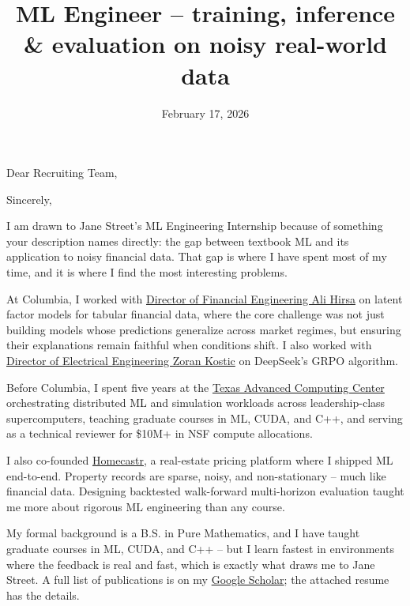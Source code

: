 \documentclass[letterpaper, 10pt,colorlinks,linkcolor=cyan]{moderncv}
\title{\large ML Engineer -- training, inference \& evaluation on noisy real-world data}
\begin{document}
  \hypersetup{urlcolor=links}

  \date{February 17, 2026}
  \opening{Dear Recruiting Team,}
  \closing{Sincerely,}
  \makelettertitle

I am drawn to Jane Street's ML Engineering Internship because of something your description names directly: the gap between textbook ML and its application to noisy financial data. That gap is where I have spent most of my time, and it is where I find the most interesting problems.

At Columbia, I worked with \href{https://alihrsa.github.io/}{Director of Financial Engineering Ali Hirsa} on latent factor models for tabular financial data, where the core challenge was not just building models whose predictions generalize across market regimes, but ensuring their explanations remain faithful when conditions shift. I also worked with \href{https://kostic.ece.columbia.edu/}{Director of Electrical Engineering Zoran Kostic} on DeepSeek's GRPO algorithm.

Before Columbia, I spent five years at the \href{https://www.tacc.utexas.edu/}{Texas Advanced Computing Center} orchestrating distributed ML and simulation workloads across leadership-class supercomputers, teaching graduate courses in ML, CUDA, and C++, and serving as a technical reviewer for \$10M+ in NSF compute allocations.

I also co-founded \href{https://www.homecastr.com/}{Homecastr}, a real-estate pricing platform where I shipped ML end-to-end. Property records are sparse, noisy, and non-stationary -- much like financial data. Designing backtested walk-forward multi-horizon evaluation taught me more about rigorous ML engineering than any course.

My formal background is a B.S. in Pure Mathematics, and I have taught graduate courses in ML, CUDA, and C++ -- but I learn fastest in environments where the feedback is real and fast, which is exactly what draws me to Jane Street. A full list of publications is on my \href{https://scholar.google.com/citations?user=agBdssgAAAAJ}{Google Scholar}; the attached resume has the details.

  \makeletterclosing
  \clearpage

  \vspace*{-2.5em}
  \makecvtitle
\end{document}
